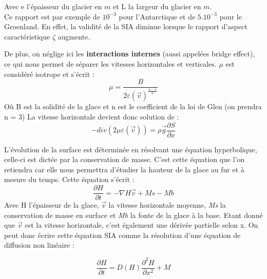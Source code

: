 \documentclass{article}
\begin{document}
Avec e l'épaisseur du glacier en $m$ et L la largeur du glacier en $m$. \\
Ce rapport est par exemple de $10^{-3}$ pour l'Antarctique et de $5.10^{-3}$ pour le Groenland. En effet, la validité de la SIA diminue lorsque le rapport d'aspect caractéristique $\zeta$ augmente. 

De plus, on néglige ici les \textbf{interactions internes} (aussi appelées bridge effect), ce qui nous permet de séparer les vitesses horizontales et verticales. $\mu$ est considéré isotrope et s'écrit :
\begin{equation}
\mu = \frac{B}{2\varepsilon(\vec{v})^\frac{n-1}{n}}
\label{eq2}      
\end{equation}
Où B est la solidité de la glace et n est le coefficient de la loi de Glen (on prendra n = 3)
\newline
La vitesse horizontale devient donc solution de :
\begin{equation}
-div(2 \mu \varepsilon(\vec{v}))  = \rho \vec{g}\frac{{\partial}S}{\partial x}
\label{eq3}
\end{equation}
\newpage 

L'évolution de la surface est déterminée en résolvant une équation hyperbolique, celle-ci est dictée par la conservation de masse. C'est cette équation que l'on retiendra car elle nous permettra d'étudier la hauteur de la glace au fur et à mesure du temps.
Cette équation s'écrit :
\begin{equation}
\frac{\partial H}{\partial t}=-\nabla H\vec{v} + Ms - Mb
\label{eq3}
\end{equation}
Avec H l'épaisseur de la glace, $\vec{v}$ la vitesse horizontale moyenne, \textit{Ms} la conservation de masse en surface et \textit{Mb} la fonte de la glace à la base.
Etant donné que $\vec{v}$ est la vitesse horizontale, c'est également une dérivée partielle selon x.
On peut donc écrire cette équation SIA comme la résolution d'une équation de diffusion non linéaire : 

\begin{equation}
\frac{\partial H}{\partial t}=D(H)\frac{{\partial}^{2}H}{\partial x^{2}} + M
\label{eq4}
\end{equation}
\end{document}
